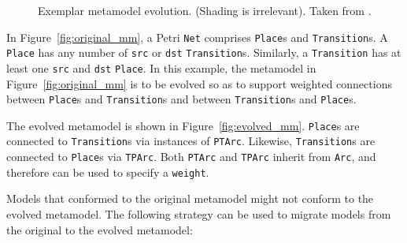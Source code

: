\begin{figure}[bp]
	\centering
	\caption{Exemplar metamodel evolution. (Shading is irrelevant). Taken from \cite{rose10flock}.}
\label{fig:petri_nets_mms}
\end{figure}

In Figure~\ref{fig:original_mm}, a Petri \texttt{Net} comprises \texttt{Place}s and \texttt{Transition}s. A \texttt{Place} has any number of \texttt{src} or \texttt{dst} \texttt{Transition}s. Similarly, a \texttt{Transition} has at least one \texttt{src} and \texttt{dst} \texttt{Place}. In this example, the metamodel in Figure~\ref{fig:original_mm} is to be evolved so as to support weighted connections between \texttt{Place}s and \texttt{Transition}s and between \texttt{Transition}s and \texttt{Place}s.

The evolved metamodel is shown in Figure~\ref{fig:evolved_mm}. \texttt{Place}s are connected to \texttt{Transition}s via instances of \texttt{PTArc}. Likewise, \texttt{Transition}s are connected to \texttt{Place}s via \texttt{TPArc}. Both \texttt{PTArc} and \texttt{TPArc} inherit from \texttt{Arc}, and therefore can be used to specify a \texttt{weight}.

Models that conformed to the original metamodel might not conform to the evolved metamodel. The following strategy can be used to migrate models from the original to the evolved metamodel:

